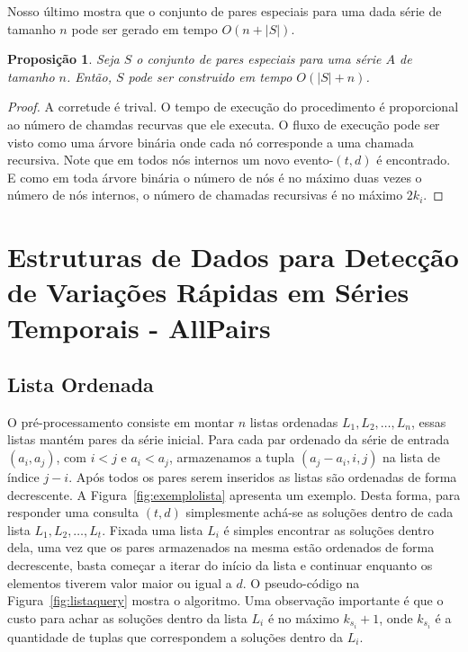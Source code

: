 \documentclass[12pt]{article}
\newtheorem{prop}[thm]{Proposição}
\begin{document}
Nosso último mostra que o conjunto de pares especiais para uma dada série de tamanho
$n$ pode ser gerado em tempo $O(n + |S|)$. 

\begin{prop}
Seja $S$ o conjunto de pares especiais para uma série $A$ de tamanho $n$. Então, 
$S$ pode ser construido em tempo $O(|S| + n)$.
\end{prop}
\begin{proof}
A corretude é trival. O tempo de execução do procedimento é proporcional ao
número de chamdas recurvas que ele executa. O fluxo de execução pode ser visto
como uma árvore binária onde cada nó corresponde a uma chamada recursiva.
Note que em todos nós internos um novo evento-$(t,d)$ é encontrado. E como
em toda árvore binária o número de nós é no máximo duas vezes o número de nós
internos, o número de chamadas recursivas é no máximo $2k_i$.
\end{proof}

\section{Estruturas de Dados para Detecção de Variações Rápidas em Séries Temporais - AllPairs}

\subsection{Lista Ordenada}

O pré-processamento consiste em montar $n$ listas ordenadas $L_1, L_2, \ldots, L_n$, 
essas listas mantém pares da série inicial. Para cada par ordenado da série de entrada $(a_i, a_j)$, com $i < j$ e $a_i < a_j$,
armazenamos a tupla $(a_j - a_i, i, j)$ na lista de índice $j - i$.
Após todos os pares serem inseridos as listas são ordenadas de forma decrescente. A Figura~\ref{fig:exemplolista} apresenta um exemplo.
Desta forma, para responder uma consulta $(t, d)$ simplesmente achá-se as soluções
dentro de cada lista $L_1, L_2, \ldots, L_t$. Fixada uma lista $L_i$ é simples
encontrar as soluções dentro dela, uma vez que os pares armazenados na mesma
estão ordenados de forma decrescente, basta começar a iterar do início
da lista e continuar enquanto os elementos tiverem valor maior ou igual a	$d$.
O pseudo-código na Figura~\ref{fig:listaquery} mostra o algoritmo. Uma observação importante é 
que o custo para achar as soluções dentro da lista $L_i$ é no máximo $k_{s_i} + 1$,
 onde $k_{s_i}$ é a quantidade de tuplas que correspondem a soluções dentro da $L_i$. 
\end{document}
